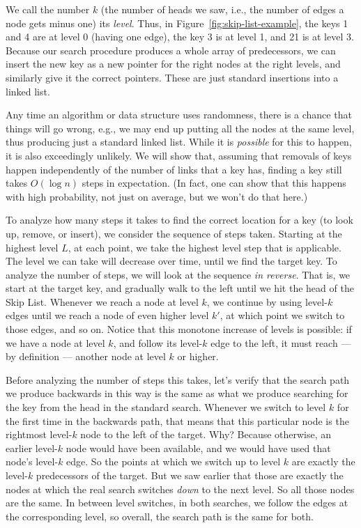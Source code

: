 We call the number $k$ (the number of heads we saw, i.e., the number
of edges a node gets minus one) its \emph{level}. 
Thus, in Figure~\ref{fig:skip-list-example}, the keys 1 and 4 are at
level 0 (having one edge), the key 3 is at level 1, and 21 is at level 3. 
Because our search procedure produces a whole array  of
predecessors, we can insert the new key as a new 
 pointer for the right nodes at the right levels, and
similarly give it the correct  pointers. These are just
standard insertions into a linked list.

Any time an algorithm or data structure uses randomness, there is a
chance that things will go wrong, e.g., we may end up putting all the
nodes at the same level, thus producing just a standard linked list.
While it is \emph{possible} for this to happen, it is also exceedingly
unlikely. We will show that, assuming that removals of keys happen
independently of the number of links that a key has, finding a key
still takes $O(\log n)$ steps in expectation. (In fact, one can show
that this happens with high probability, not just on average, but we
won't do that here.)

To analyze how many steps it takes to find the correct location for a
key (to look up, remove, or insert), we consider the sequence of steps
taken. 
Starting at the highest level $L$, 
at each point, we take the highest level step that is applicable.
The level we can take will decrease over time, until we find the
target key. To analyze the number of steps, we will look at the
sequence \emph{in reverse}. 
That is, we start at the target key, and gradually walk to the left
until we hit the head of the Skip List. Whenever we reach a node at
level $k$, we continue by using level-$k$ edges until we reach a node
of even higher level $k'$, at which point we switch to those edges,
and so on. Notice that this monotone increase of levels is possible:
if we have a node at level $k$, and follow its level-$k$ edge to the
left, it must reach --- by definition --- another node at level $k$ or
higher.

Before analyzing the number of steps this takes, let's verify that the
search path we produce backwards in this way is the same as what we
produce searching for the key from the head in the standard search.
Whenever we switch to level $k$ for the first time in the backwards
path, that means that this particular node is the rightmost level-$k$
node to the left of the target. Why? Because otherwise, an earlier
level-$k$ node would have been available, and we would have used that
node's level-$k$ edge. So the points at which we switch up to level
$k$ are exactly the level-$k$ predecessors of the target.
But we saw earlier that those are exactly the nodes at which the real
search switches \emph{down} to the next level. So all those nodes are
the same. In between level switches, in both searches, we follow the
edges at the corresponding level, so overall, the search path is the
same for both.


